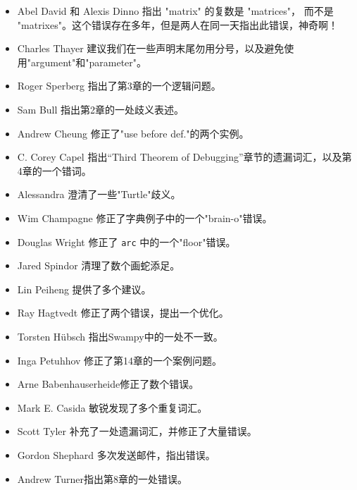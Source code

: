 \documentclass[10pt]{book}
\begin{document}
\begin{itemize}
\item Abel David 和 Alexis Dinno 指出 "matrix" 的复数是 "matrices"，
而不是 "matrixes"。这个错误存在多年，但是两人在同一天指出此错误，神奇啊！

\item Charles Thayer 建议我们在一些声明末尾勿用分号，以及避免使用"argument"和"parameter"。

\item Roger Sperberg 指出了第3章的一个逻辑问题。

\item Sam Bull 指出第2章的一处歧义表述。

\item Andrew Cheung 修正了"use before def."的两个实例。

\item C. Corey Capel 指出“Third Theorem
of Debugging”章节的遗漏词汇，以及第4章的一个错词。

\item Alessandra 澄清了一些"Turtle"歧义。

\item Wim Champagne  修正了字典例子中的一个"brain-o"错误。

\item Douglas Wright 修正了 {\tt arc} 中的一个"floor"错误。

\item Jared Spindor 清理了数个画蛇添足。

\item Lin Peiheng 提供了多个建议。

\item Ray Hagtvedt 修正了两个错误，提出一个优化。

\item Torsten H\"{u}bsch 指出Swampy中的一处不一致。

\item Inga Petuhhov 修正了第14章的一个案例问题。

\item Arne Babenhauserheide修正了数个错误。

\item Mark E. Casida 敏锐发现了多个重复词汇。

\item Scott Tyler 补充了一处遗漏词汇，并修正了大量错误。

\item Gordon Shephard 多次发送邮件，指出错误。

\item Andrew Turner指出第8章的一处错误。


\end{itemize}
\end{document}
